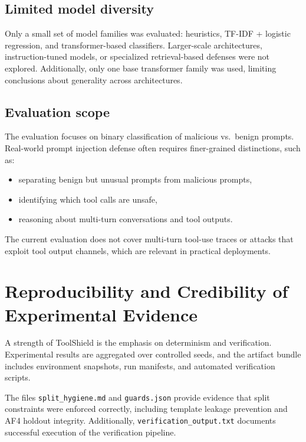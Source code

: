 \subsection{Limited model diversity}

Only a small set of model families was evaluated: heuristics, TF-IDF + logistic regression, and transformer-based classifiers. Larger-scale architectures, instruction-tuned models, or specialized retrieval-based defenses were not explored. Additionally, only one base transformer family was used, limiting conclusions about generality across architectures.

\subsection{Evaluation scope}

The evaluation focuses on binary classification of malicious vs.\ benign prompts. Real-world prompt injection defense often requires finer-grained distinctions, such as:
\begin{itemize}
    \item separating benign but unusual prompts from malicious prompts,
    \item identifying which tool calls are unsafe,
    \item reasoning about multi-turn conversations and tool outputs.
\end{itemize}

The current evaluation does not cover multi-turn tool-use traces or attacks that exploit tool output channels, which are relevant in practical deployments.

\section{Reproducibility and Credibility of Experimental Evidence}
\label{subsec:discussion_reproducibility}

A strength of ToolShield is the emphasis on determinism and verification. Experimental results are aggregated over controlled seeds, and the artifact bundle includes environment snapshots, run manifests, and automated verification scripts.

The files \texttt{split\_hygiene.md} and \texttt{guards.json} provide evidence that split constraints were enforced correctly, including template leakage prevention and AF4 holdout integrity. Additionally, \texttt{verification\_output.txt} documents successful execution of the verification pipeline.

